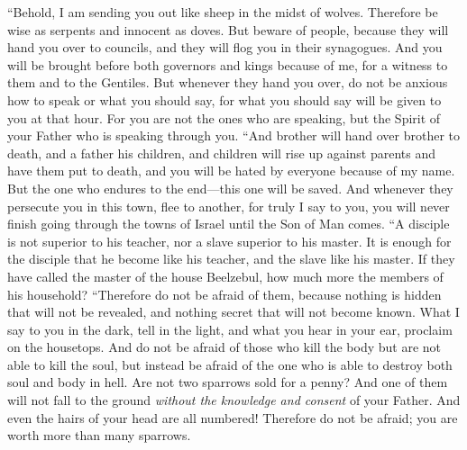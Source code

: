 \begin{biblechapter}
 “Behold, I am sending you out like sheep in the midst of wolves. Therefore be wise as serpents and innocent as doves.
\verse But beware of people, because they will hand you over to councils, and they will flog you in their synagogues.
\verse And you will be brought before both governors and kings because of me, for a witness to them and to the Gentiles.
\verse But whenever they hand you over, do not be anxious how to speak or what you should say, for what you should say will be given to you at that hour.
\verse For you are not the ones who are speaking, but the Spirit of your Father who is speaking through you.
\verse “And brother will hand over brother to death, and a father his children, and children will rise up against parents and have them put to death,
\verse and you will be hated by everyone because of my name. But the one who endures to the end—this one will be saved.
\verse And whenever they persecute you in this town, flee to another, for truly I say to you, you will never finish going through the towns of Israel until the Son of Man comes.
\verse “A disciple is not superior to his teacher, nor a slave superior to his master.
\verse It is enough for the disciple that he become like his teacher, and the slave like his master. If they have called the master of the house Beelzebul, how much more the members of his household?
 “Therefore do not be afraid of them, because nothing is hidden that will not be revealed, and nothing secret that will not become known.
\verse What I say to you in the dark, tell in the light, and what you hear in your ear, proclaim on the housetops.
\verse And do not be afraid of those who kill the body but are not able to kill the soul, but instead be afraid of the one who is able to destroy both soul and body in hell.
\verse Are not two sparrows sold for a penny? And one of them will not fall to the ground \textit{without the knowledge and consent} of your Father.
\verse And even the hairs of your head are all numbered!
\verse Therefore do not be afraid; you are worth more than many sparrows.

\end{biblechapter}
